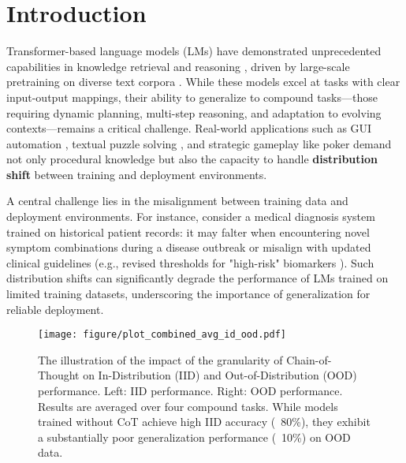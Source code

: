 
\vspace{-1em}
\section{Introduction}

Transformer-based language models (LMs) \cite{brown2020language,chowdhery2022palm,touvron2023llama} have demonstrated unprecedented capabilities in knowledge retrieval \cite{kojima2022large,wei2022chain,wei2022emergent}  and reasoning \cite{hendrycks2020measuring,cobbe2021training}, driven by large-scale pretraining on diverse text corpora \cite{ouyang2022training,wei2021finetuned,longpre2023flan}. While these models excel at tasks with clear input-output mappings, their ability to generalize to compound tasks—those requiring dynamic planning, multi-step reasoning, and adaptation to evolving contexts—remains a critical challenge. Real-world applications such as GUI automation \cite{wang2024gui,yang2024aria, shen2024falcon, qinghong2024showui, verma2024adaptagent}, textual puzzle solving \cite{giadikiaroglou2024puzzle,saha2024language}, and strategic gameplay like poker \cite{guo2023suspicion,zhang2024agent,huang2024pokergpt} demand not only procedural knowledge but also the capacity to handle \textbf{distribution shift} between training and deployment environments. 

A central challenge lies in the misalignment between training data and deployment environments. For instance, consider a medical diagnosis system trained on historical patient records: it may falter when encountering novel symptom combinations during a disease outbreak or misalign with updated clinical guidelines (e.g., revised thresholds for "high-risk" biomarkers \cite{welsh2016prediction}). Such distribution shifts can significantly degrade the performance of LMs trained on limited training datasets, underscoring the importance of generalization for reliable deployment.


\begin{figure}
    \centering
        \texttt{[image: figure/plot\_combined\_avg\_id\_ood.pdf]}
    
    \caption{The illustration of the impact of the granularity of Chain-of-Thought on In-Distribution (IID) and Out-of-Distribution (OOD) performance. Left: IID performance. Right: OOD performance. Results are averaged over four compound tasks.  While models trained without CoT achieve high IID accuracy (~80\%), they exhibit a substantially poor generalization performance (~10\%) on OOD data.
}
    \label{fig:average}
\end{figure}

